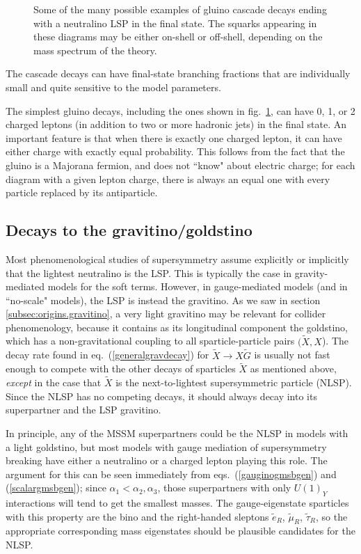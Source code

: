\documentclass[11pt]{article}
\def\stilde{\widetilde}
\def\G{\stilde G}
\begin{document}
\begin{figure}
\caption{Some of the many possible examples of gluino cascade decays 
ending with a neutralino LSP in the final state. The squarks appearing in 
these diagrams may be either on-shell or off-shell, depending on the mass 
spectrum of the theory.\label{fig:gluinocascades}}
\end{figure}
The cascade decays can have final-state branching fractions that are 
individually small and quite sensitive to the model parameters.

The simplest gluino decays, including the ones shown in 
fig.~\ref{fig:gluinocascades}, can have 0, 1, or 2 charged leptons (in 
addition to two or more hadronic jets) in the final state.  An important 
feature is that when there is exactly one charged lepton, it can have 
either charge with exactly equal probability.  This follows from the fact 
that the gluino is a Majorana fermion, and does not ``know" about electric 
charge; for each diagram with a given lepton charge, there is always an 
equal one with every particle replaced by its antiparticle.

\subsection{Decays to the gravitino/goldstino}\label{subsec:decays.gravitino}
\setcounter{equation}{0}
\setcounter{footnote}{1}

Most phenomenological studies of supersymmetry assume explicitly or 
implicitly that the lightest neutralino is the LSP. This is typically the 
case in gravity-mediated models for the soft terms. However, in 
gauge-mediated models (and in ``no-scale" models), the LSP is instead the 
gravitino. As we saw in section \ref{subsec:origins.gravitino}, a very 
light gravitino may be relevant for collider phenomenology, because it 
contains as its longitudinal component the goldstino, which has a 
non-gravitational coupling to all sparticle-particle pairs $(\stilde X, 
X$). The decay rate found in eq.~(\ref{generalgravdecay}) for $\stilde 
X\rightarrow X\G$ is usually not fast enough to compete with the other 
decays of sparticles $\stilde X$ as mentioned above, {\it except} in the 
case that $\stilde X$ is the next-to-lightest supersymmetric particle 
(NLSP). Since the NLSP has no competing decays, it should always decay 
into its superpartner and the LSP gravitino.

In principle, any of the MSSM superpartners could be the NLSP in models 
with a light goldstino, but most models with gauge mediation of 
supersymmetry breaking have either a neutralino or a charged lepton 
playing this role. The argument for this can be seen immediately from 
eqs.~(\ref{gauginogmsbgen}) and (\ref{scalargmsbgen}); since $\alpha_1 < 
\alpha_2,\alpha_3$, those superpartners with only $U(1)_Y$ interactions 
will tend to get the smallest masses. The gauge-eigenstate sparticles with 
this property are the bino and the right-handed sleptons $\stilde e_R$, 
$\stilde \mu_R$, $\stilde \tau_R$, so the appropriate corresponding mass 
eigenstates should be plausible candidates for the NLSP.
\end{document}
